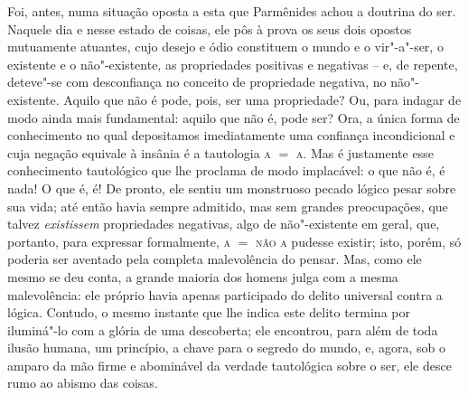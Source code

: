 Foi, antes, numa situação oposta a esta que Parmênides achou a doutrina
do ser. Naquele dia e nesse estado de coisas, ele pôs à prova os seus
dois opostos mutuamente atuantes, cujo desejo e ódio constituem o mundo
e o vir"-a"-ser, o existente e o não"-existente, as propriedades positivas
e negativas -- e, de repente, deteve"-se com desconfiança no conceito de
propriedade negativa, no não"-existente. Aquilo que não é pode, pois,
ser uma propriedade? Ou, para indagar de modo ainda mais fundamental:
aquilo que não é, pode ser? Ora, a única forma de conhecimento no qual
depositamos imediatamente uma confiança incondicional e cuja negação
equivale à insânia é a tautologia \textsc{a} $=$ \textsc{a}. Mas é justamente esse
conhecimento tautológico que lhe proclama de modo implacável: o que não
é, é nada! O que é, é! De pronto, ele sentiu um monstruoso pecado
lógico pesar sobre sua vida; até então havia sempre admitido, mas sem
grandes preocupações, que talvez \textit{existissem} propriedades
negativas, algo de não"-existente em geral, que, portanto, para
expressar formalmente, \textsc{a} $=$ \textsc{não a} pudesse existir; isto, porém, só
poderia ser aventado pela completa malevolência do pensar. Mas, como
ele mesmo se deu conta, a grande maioria dos homens julga com a mesma
malevolência: ele próprio havia apenas participado do delito universal
contra a lógica. Contudo, o mesmo instante que lhe indica este delito
termina por iluminá"-lo com a glória de uma descoberta; ele encontrou,
para além de toda ilusão humana, um princípio, a chave para o segredo
do mundo, e, agora, sob o amparo da mão firme e abominável da verdade
tautológica sobre o ser, ele desce rumo ao abismo das coisas.

